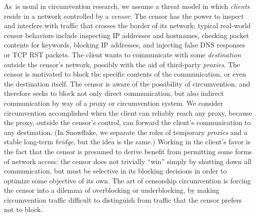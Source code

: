 \documentclass[letterpaper,twocolumn]{article}
\newcommand{\firstterm}[1]{\textit{#1}}
\begin{document}
As~is usual in circumvention research,
we assume a threat model in which
\firstterm{clients} reside in a network
controlled by a \firstterm{censor}.
The censor has the power to inspect and interfere with
traffic that crosses the border of its network;
typical real-world censor behaviors include
inspecting IP addresses and hostnames,
checking packet contents for keywords,
blocking IP addresses, and injecting false DNS responses
or TCP RST packets.
The client wants to communicate with some
\firstterm{destination} outside the censor's network,
possibly with the aid of third-party \firstterm{proxies}.
The censor is motivated to block the specific contents
of the communication, or even the destination itself.
The censor is aware of the possibility of circumvention,
and therefore seeks to block not only direct communication,
but also indirect communication by way of a proxy or circumvention system.
We consider circumvention accomplished when the client
can reliably reach any proxy,
because the proxy, outside the censor's control,
can forward the client's communication to any destination.
(In Snowflake, we separate the roles of temporary \firstterm{proxies}
and a stable long-term \firstterm{bridge}, but the idea is the same.)
Working in the client's favor
is the fact that the censor is presumed to derive benefit
from permitting some forms of network access:
the censor does not trivially ``win''
simply by shutting down all communication,
but must be selective in its blocking decisions
in order to optimize some objective of its own.
The art of censorship circumvention is
forcing the censor into a dilemma
of overblocking or underblocking,
by making circumvention traffic difficult to distinguish
from traffic that the censor prefers not to block.
\end{document}
